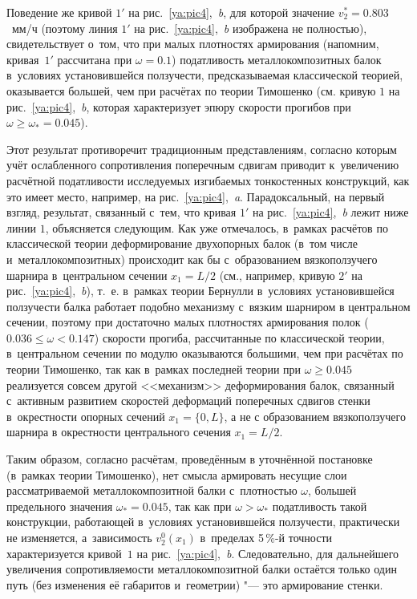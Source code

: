 Поведение же кривой $1'$ на рис.~\ref{ya:pic4},~{\sl b}, для которой значение $v_2^*=0.803$~мм/ч 
(поэтому линия $1'$ на рис.~\ref{ya:pic4},~{\sl b} изображена не полностью), 
свидетельствует о~том, что при малых плотностях армирования (напомним, кривая~$1'$ рассчитана при $\omega=0.1$) 
податливость металлокомпозитных балок в~условиях установившейся ползучести, 
предсказываемая классической теорией, оказывается большей, чем при расчётах по теории Тимошенко (см. кривую $1$ на рис.~\ref{ya:pic4},~{\sl b}, которая характеризует эпюру скорости прогибов при $\omega\ge\omega_*=0.045$).

Этот результат противоречит традиционным представлениям, согласно которым учёт ослабленного сопротивления поперечным сдвигам приводит к~увеличению расчётной податливости исследуемых изгибаемых тонкостенных конструкций, как это имеет место, например, на рис.~\ref{ya:pic4},~{\sl a}. 
Парадоксальный, на первый взгляд, результат, связанный с~тем, что кривая $1'$ на рис.~\ref{ya:pic4},~{\sl b} лежит ниже линии $1$, объясняется следующим. 
Как уже отмечалось, в~рамках расчётов по классической теории деформирование двухопорных балок (в~том числе и~металлокомпозитных) происходит как бы с~образованием вязкоползучего шарнира в~центральном сечении $x_1=L/2$ (см., например, кривую $2'$ на рис.~\ref{ya:pic4},~{\sl b}), т.~е. в~рамках теории Бернулли в~условиях установившейся ползучести балка работает подобно механизму с~вязким шарниром в центральном сечении, поэтому при достаточно малых плотностях армирования полок ($0.036\le\omega<0.147$) скорости прогиба, рассчитанные по классической теории, в~центральном сечении по модулю оказываются большими, чем при расчётах по теории Тимошенко, так как в~рамках последней теории при $\omega\ge0.045$ реализуется совсем другой <<механизм>> деформирования балок, связанный с~активным развитием скоростей деформаций поперечных сдвигов стенки в~окрестности опорных сечений $x_1=\{0, L\}$, а не с образованием вязкоползучего шарнира в окрестности центрального сечения $x_1=L/2$.

Таким образом, согласно расчётам, проведённым в уточнённой постановке (в~рамках теории Тимошенко), нет смысла армировать несущие слои рассматриваемой металлокомпозитной балки с~плотностью $\omega$, 
большей предельного значения $\omega_*=0.045$, так как при $\omega>\omega_*$ податливость такой конструкции, работающей в~условиях установившейся ползучести, практически не изменяется, а~зависимость $v_2^0(x_1)$ в~пределах 5\,\%-й точности характеризуется кривой~$1$ на рис.~\ref{ya:pic4},~{\sl b}. 
Следовательно, для дальнейшего увеличения сопротивляемости металлокомпозитной балки остаётся только один путь (без изменения её габаритов и~геометрии) "--- это армирование стенки.

